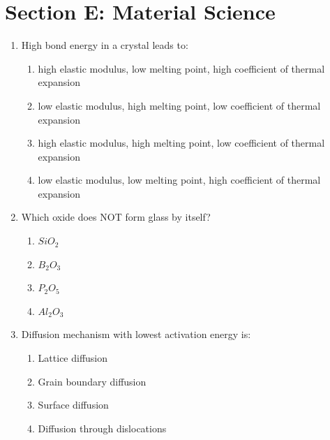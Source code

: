 \documentclass[journal,cmex10]{IEEEtran}
\theoremstyle{remark}
\numberwithin{equation}{enumi}
\numberwithin{figure}{enumi}
\begin{document}
\newpage
\section*{Section E: Material Science}

\begin{enumerate}[label=\arabic*)]
\vspace{2\baselineskip}


\item High bond energy in a crystal leads to:  
\vspace{0.3cm}
\hfill{}

\begin{enumerate}[label=\alph*)]
    \item high elastic modulus, low melting point, high coefficient of thermal expansion
    \item low elastic modulus, high melting point, low coefficient of thermal expansion
    \item high elastic modulus, high melting point, low coefficient of thermal expansion
    \item low elastic modulus, low melting point, high coefficient of thermal expansion
\end{enumerate}

\vspace{0.5cm}
\item Which oxide does NOT form glass by itself?  
\hfill{}
\begin{enumerate}[label=\alph*)]
    \item $SiO_{2}$
    \item $B_2$$O_3$
    \item $P_2$$O_5$
    \item $Al_2$$O_3$
\end{enumerate}

\vspace{0.5cm}
\item Diffusion mechanism with lowest activation energy is:  
\hfill{}
\begin{enumerate}[label=\alph*)]
    \item Lattice diffusion
    \item Grain boundary diffusion
    \item Surface diffusion
    \item Diffusion through dislocations
\end{enumerate}


\end{enumerate}
\end{document}
